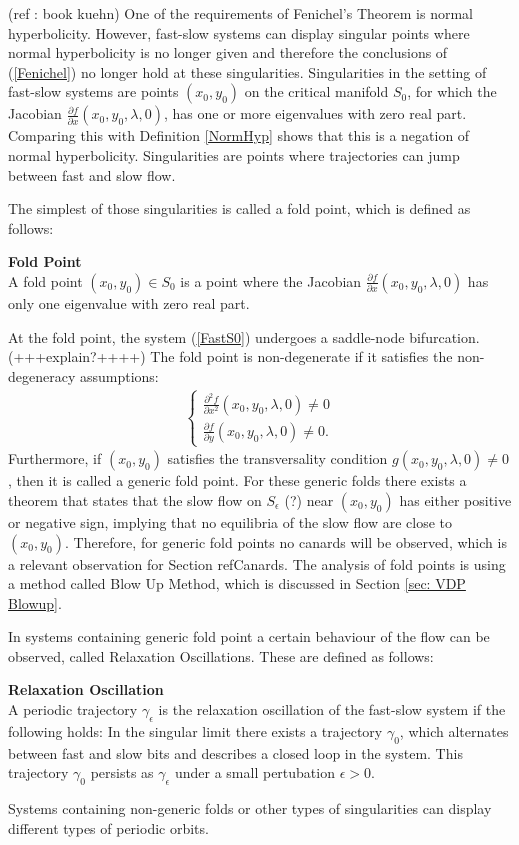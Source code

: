  (ref : book kuehn)
One of the requirements of Fenichel's Theorem is normal hyperbolicity. However, fast-slow systems can display singular points where normal hyperbolicity is no longer given and therefore the conclusions of (\ref{Fenichel}) no longer hold at these singularities.
Singularities in the setting of fast-slow systems are points $(x_0,y_0)$ on the critical manifold $S_0$, for which the Jacobian $ \frac{\partial f}{\partial x}(x_0,y_0, \lambda, 0)$, has one or more eigenvalues with zero real part. Comparing this with Definition \ref{NormHyp} shows that this is a negation of normal hyperbolicity. Singularities are points where trajectories can jump between fast and slow flow. 

The simplest of those singularities is called a fold point, which is defined as follows:
\begin{definition}{\textbf{Fold Point}} \label{FoldDef} \\
A fold point $(x_0,y_0) \in S_0$ is a point where the Jacobian $ \frac{\partial f}{\partial x}(x_0,y_0, \lambda, 0)$ has only one eigenvalue with zero real part.
\end{definition}
At the fold point, the system (\ref{FastS0}) undergoes a saddle-node bifurcation. (+++explain?++++)
The fold point is non-degenerate if it satisfies the non-degeneracy assumptions:
\begin{align} \label{NonDeg}
\begin{cases}
\frac{ \partial ^2 f}{ \partial x^2} (x_0,y_0, \lambda, 0) \neq 0 \\
\frac{\partial f}{\partial y}(x_0,y_0, \lambda, 0) \neq 0.
\end{cases}
\end{align}
Furthermore, if $(x_0,y_0)$ satisfies the transversality condition $g(x_0,y_0, \lambda, 0) \neq 0$, then it is called a generic fold point.
For these generic folds there exists a theorem that states that the slow flow on $S_\epsilon$ (?) near $(x_0,y_0)$ has either positive or negative sign, implying that no equilibria of the slow flow are close to $(x_0,y_0)$. Therefore, for generic fold points no canards will be observed, which is a relevant observation for Section ref{Canards}.
The analysis of fold points is using a method called Blow Up Method, which is discussed in Section \ref{sec: VDP Blowup}.

In systems containing generic fold point a certain behaviour of the flow can be observed, called Relaxation Oscillations. These are defined as follows:
\begin{definition}{\textbf{Relaxation Oscillation}}\\
A periodic trajectory $\gamma_\epsilon$ is the relaxation oscillation of the fast-slow system if the following holds:
In the singular limit there exists a trajectory $\gamma_0$, which alternates between fast and slow bits and describes a closed loop in the system. This trajectory $\gamma_0$ persists as $\gamma_\epsilon$ under a small pertubation $\epsilon >0$.
\end{definition} 
Systems containing non-generic folds or other types of singularities can display different types of periodic orbits.
